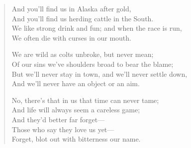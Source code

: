 \begin{verse}
And you'll find us in Alaska after gold,\\
\hspace*{3em}And you'll find us herding cattle in the South.\\
We like strong drink and fun; and when the race is run,\\
\hspace*{3em}We often die with curses in our mouth.

We are wild as colts unbroke, but never mean;\\
\hspace*{3em}Of our sins we've shoulders broad to bear the blame;\\
But we'll never stay in town, and we'll never settle down,\\
\hspace*{3em}And we'll never have an object or an aim.

No, there's that in us that time can never tame;\\
And life will always seem a careless game;\\
\hspace*{3em}And they'd better far forget—\\
\hspace*{3em}Those who say they love us yet—\\
Forget, blot out with bitterness our name.

\end{verse}
